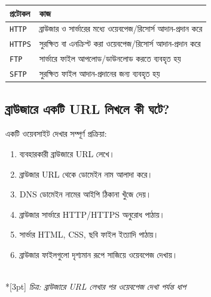 \begin{center}
\begin{tabular}{|p{}|p{}|}
\hline
\textbf{প্রটোকল} & \textbf{কাজ} \\
\hline
\texttt{HTTP} & ব্রাউজার ও সার্ভারের মধ্যে ওয়েবপেজ/রিসোর্স আদান-প্রদান করে \\
\hline
\texttt{HTTPS} & সুরক্ষিত বা এনক্রিপ্ট করা ওয়েবপেজ/রিসোর্স আদান-প্রদান করে \\
\hline
\texttt{FTP} & সার্ভারে ফাইল আপলোড/ডাউনলোড করতে ব্যবহৃত হয় \\
\hline
\texttt{SFTP} & সুরক্ষিত ফাইল আদান-প্রদানের জন্য ব্যবহৃত হয় \\
\hline
\end{tabular}
\end{center}





\subsection{ব্রাউজারে একটি URL লিখলে কী ঘটে?}

একটি ওয়েবসাইট দেখার সম্পূর্ণ প্রক্রিয়া:

\begin{enumerate}
\item ব্যবহারকারী ব্রাউজারে URL লেখে।
\item ব্রাউজার URL থেকে ডোমেইন নাম আলাদা করে।
\item DNS ডোমেইন নামের আইপি ঠিকানা খুঁজে দেয়।
\item ব্রাউজার সার্ভারে HTTP/HTTPS অনুরোধ পাঠায়।
\item সার্ভার HTML, CSS, ছবি ফাইল ইত্যাদি পাঠায়।
\item ব্রাউজার ফাইলগুলো দৃশ্যমান রূপে সাজিয়ে ওয়েবপেজ দেখায়।
\end{enumerate}

\begin{center}
\\*[3pt]
\textit{চিত্র: ব্রাউজারে URL লেখার পর ওয়েবপেজ দেখা পর্যন্ত ধাপ}
\end{center}

